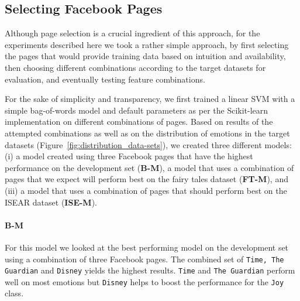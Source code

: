 \documentclass[11pt]{article}
\begin{document}


\subsection{Selecting Facebook Pages}
\label{sec:selecting}

Although page selection is a crucial ingredient of this approach, for the experiments described here we took a rather simple approach, by first selecting the pages that would provide training data based on intuition and availability, then choosing different combinations according to the target datasets for evaluation, and eventually testing feature combinations. 

For the sake of simplicity and transparency, we first trained a linear SVM with a simple bag-of-words model and default parameters as per the Scikit-learn implementation \cite{scikit-learn} on different combinations of pages. Based on results of the attempted combinations as well as on the distribution of emotions in the target datasets (Figure~\ref{fig:distribution_data-sets}), we created three different models: (i) a model created using three Facebook pages that have the highest performance on the development set (\textbf{B-M}), a model that uses a combination of pages that we expect will perform best on the fairy tales dataset (\textbf{FT-M}), and (iii) a model that uses a combination of pages that should perform best on the ISEAR dataset (\textbf{ISE-M}).


\paragraph{B-M}
For this model we looked at the best performing model on the development set using a combination of three Facebook pages. The combined set of \texttt{Time, The Guardian} and \texttt{Disney} yields the highest results. \texttt{Time} and \texttt{The Guardian} perform well on most emotions but \texttt{Disney} helps to boost the performance for the \texttt{Joy} class.
\end{document}
